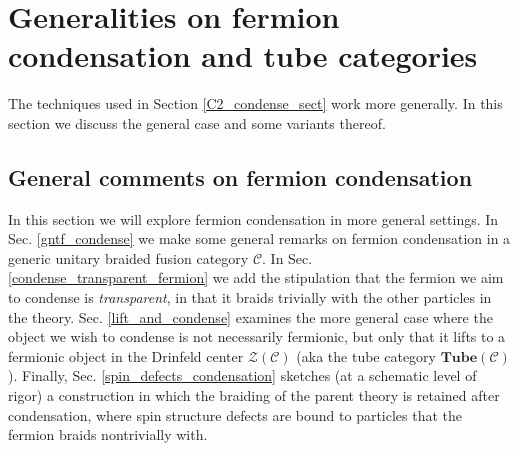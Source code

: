 \documentclass[12pt,a4paper]{article}
\newcommand{\mcz}{\mathcal{Z}}
\newcommand{\mcc}{\mathcal{C}}
\newcommand{\tube}{\textbf{Tube}}
\begin{document}

\section{Generalities on fermion condensation and tube categories} \label{generalities} 

The techniques used in Section \ref{C2_condense_sect} work more generally.
In this section we discuss the general case and some variants thereof.

\subsection{General comments on fermion condensation}

In this section we will explore fermion condensation in more general settings. 
In Sec. \ref{gntf_condense} we make some general remarks on fermion condensation in a
generic unitary braided fusion category $\mcc$. 
In Sec. \ref{condense_transparent_fermion} we add the stipulation that the fermion we aim 
to condense is {\it transparent}, in that it braids trivially with the other particles in the theory. 
Sec. \ref{lift_and_condense} examines the more general case where the object we wish to condense is 
not necessarily fermionic, but only that it lifts to a fermionic object in the Drinfeld center $\mcz(\mcc)$ 
(aka the tube category $\tube(\mcc)$).
Finally, Sec. \ref{spin_defects_condensation} sketches (at a schematic level of rigor) a construction in which the braiding 
of the parent theory is retained after condensation, where spin structure defects are bound to 
particles that the fermion braids nontrivially with. 
\end{document}
